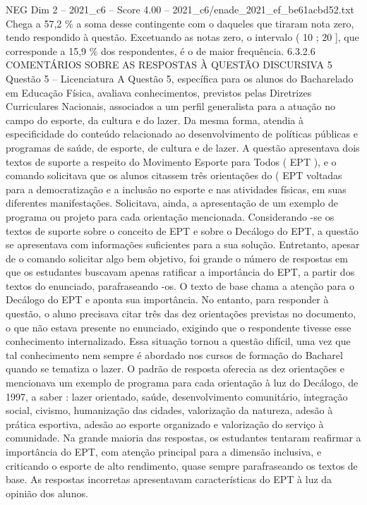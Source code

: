 \begin{textsample}{NEG Dim 2 – 2021\_c6 – Score 4.00 – 2021\_c6/enade\_2021\_ef\_be61acbd52.txt}
Chega a 57,2 \% a soma desse contingente com o daqueles que tiraram nota zero, tendo respondido à questão.
Excetuando as notas zero, o intervalo ( 10 ; 20 ], que corresponde a 15,9 \% dos respondentes, é o de maior frequência. 6.3.2.6 COMENTÁRIOS SOBRE AS RESPOSTAS À QUESTÃO DISCURSIVA 5 Questão 5 – Licenciatura A Questão 5, específica para os alunos do Bacharelado em Educação Física, avaliava conhecimentos, previstos pelas Diretrizes Curriculares Nacionais, associados a um perfil generalista para a atuação no campo do esporte, da cultura e do lazer.
Da mesma forma, atendia à especificidade do conteúdo relacionado ao desenvolvimento de políticas públicas e programas de saúde, de esporte, de cultura e de lazer.
A questão apresentava dois textos de suporte a respeito do Movimento Esporte para Todos ( EPT ), e o comando solicitava que os alunos citassem três orientações do ( EPT voltadas para a democratização e a inclusão no esporte e nas atividades físicas, em suas diferentes manifestações.
Solicitava, ainda, a apresentação de um exemplo de programa ou projeto para cada orientação mencionada.
Considerando -se os textos de suporte sobre o conceito de EPT e sobre o Decálogo do EPT, a questão se apresentava com informações suficientes para a sua solução.
Entretanto, apesar de o comando solicitar algo bem objetivo, foi grande o número de respostas em que os estudantes buscavam apenas ratificar a importância do EPT, a partir dos textos do enunciado, parafraseando -os.
O texto de base chama a atenção para o Decálogo do EPT e aponta sua importância.
No entanto, para responder à questão, o aluno precisava citar três das dez orientações previstas no documento, o que não estava presente no enunciado, exigindo que o respondente tivesse esse conhecimento internalizado.
Essa situação tornou a questão difícil, uma vez que tal conhecimento nem sempre é abordado nos cursos de formação do Bacharel quando se tematiza o lazer.
O padrão de resposta oferecia as dez orientações e mencionava um exemplo de programa para cada orientação à luz do Decálogo, de 1997, a saber : lazer orientado, saúde, desenvolvimento comunitário, integração social, civismo, humanização das cidades, valorização da natureza, adesão à prática esportiva, adesão ao esporte organizado e valorização do serviço à comunidade.
Na grande maioria das respostas, os estudantes tentaram reafirmar a importância do EPT, com atenção principal para a dimensão inclusiva, e criticando o esporte de alto rendimento, quase sempre parafraseando os textos de base.
As respostas incorretas apresentavam características do EPT à luz da opinião dos alunos.

\end{textsample}

